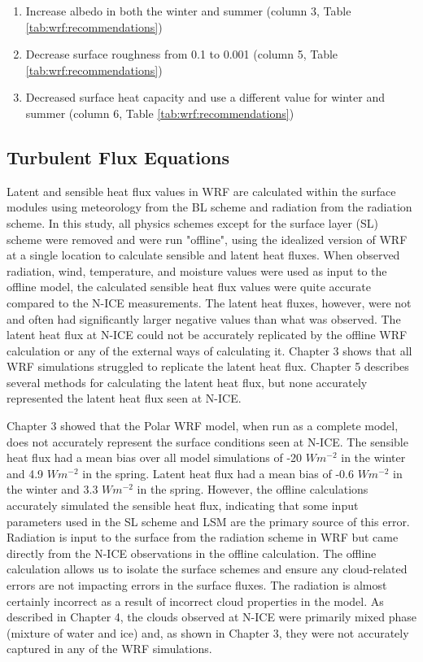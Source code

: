 \begin{enumerate}
  \item Increase albedo in both the winter and summer (column 3, Table \ref{tab:wrf:recommendations})
   \item Decrease surface roughness from 0.1 to 0.001 (column 5, Table \ref{tab:wrf:recommendations})
  \item Decreased surface heat capacity and use a different value for winter and summer (column 6, Table \ref{tab:wrf:recommendations})
\end{enumerate}

\subsection{Turbulent Flux Equations}
Latent and sensible heat flux values in WRF are calculated within the surface modules using meteorology from the BL scheme and radiation from the radiation scheme. In this study, all physics schemes except for the surface layer (SL) scheme were removed and were run "offline", using the idealized version of WRF at a single location to calculate sensible and latent heat fluxes. When observed radiation, wind, temperature, and moisture values were used as input to the offline model, the calculated sensible heat flux values were quite accurate compared to the N-ICE measurements. The latent heat fluxes, however, were not and often had significantly larger negative values than what was observed. The latent heat flux at N-ICE could not be accurately replicated by the offline WRF calculation or any of the external ways of calculating it. Chapter 3 shows that all WRF simulations struggled to replicate the latent heat flux. Chapter 5 describes several methods for calculating the latent heat flux, but none accurately represented the latent heat flux seen at N-ICE.

Chapter 3 showed that the Polar WRF model, when run as a complete model, does not accurately represent the surface conditions seen at N-ICE. The sensible heat flux had a mean bias over all model simulations of -20 $Wm^{-2}$ in the winter and 4.9 $Wm^{-2}$ in the spring. Latent heat flux had a mean bias of -0.6 $Wm^{-2}$ in the winter and 3.3 $Wm^{-2}$ in the spring. However, the offline calculations accurately simulated the sensible heat flux, indicating that some input parameters used in the SL scheme and LSM are the primary source of this error. Radiation is input to the surface from the radiation scheme in WRF but came directly from the N-ICE observations in the offline calculation. The offline calculation allows us to isolate the surface schemes and ensure any cloud-related errors are not impacting errors in the surface fluxes. The radiation is almost certainly incorrect as a result of incorrect cloud properties in the model. As described in Chapter 4, the clouds observed at N-ICE were primarily mixed phase (mixture of water and ice) and, as shown in Chapter 3, they were not accurately captured in any of the WRF simulations. 

